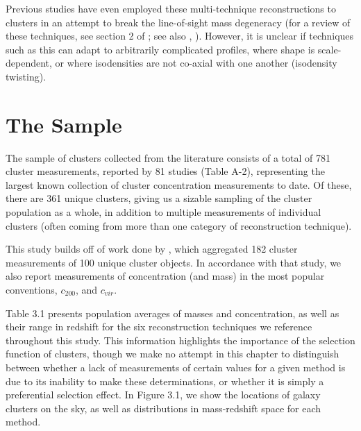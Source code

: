 Previous studies have even employed these multi-technique reconstructions to
clusters in an attempt to break the line-of-sight mass degeneracy (for a review
of these techniques, see section 2 of \citet{LI13.1}; see also \citet{AM07.1},
\citet{SE12.1}). However, it is unclear if techniques such as this can adapt to 
arbitrarily complicated profiles, where shape is scale-dependent, or where
isodensities are not co-axial with one another (isodensity twisting).

\section{The Sample}

The sample of clusters collected from the literature consists of a
total of 781 cluster measurements, reported by 81 studies (Table A-2), representing the
largest known collection of cluster concentration measurements to date. Of
these, there are 361 unique clusters, giving us a sizable sampling of
the cluster population as a whole, in addition to multiple measurements of
individual clusters (often coming from more than one category of
reconstruction technique).

This study builds off of work done by \citet{CO07.1}, which aggregated 182
cluster measurements of 100 unique cluster objects. In accordance with that
study, we also report measurements of concentration (and mass) in the most
popular conventions, $c_{200}$, and $c_{vir}$. 

Table 3.1 presents population averages of masses and concentration, as well as
their range in redshift for the six reconstruction techniques we reference
throughout this study. This information highlights the importance of the
selection function of clusters, though we make no attempt in this chapter to
distinguish between whether a lack of measurements of certain values for a given
method is due to its inability to make these determinations, or whether it is
simply a preferential selection effect. In Figure 3.1, we show the
locations of galaxy clusters on the sky, as well as distributions in
mass-redshift space for each method.

